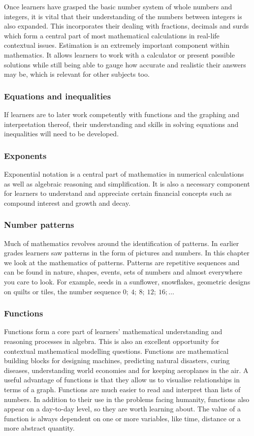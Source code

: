 Once learners have grasped the basic number system of whole numbers and integers, it is vital that their understanding of the numbers between integers is also expanded. This incorporates their dealing with fractions, decimals and surds which form a central part of most mathematical calculations in real-life contextual issues. Estimation is an extremely important component within mathematics. It allows learners to work with a calculator or present possible solutions while still being able to gauge how accurate and realistic their answers may be, which is relevant for other subjects too. 

\subsubsection{Equations and inequalities}
If learners are to later work competently with functions and the graphing and interpretation thereof, their understanding and skills in solving equations and inequalities will need to be developed. 
\subsubsection{Exponents}
Exponential notation is a central part of mathematics in numerical calculations as well as algebraic reasoning and simplification. It is also a necessary component for learners to understand and appreciate certain financial concepts such as compound interest and growth and decay. 
\subsubsection{Number patterns}
Much of mathematics revolves around the identification of patterns. In earlier grades learners saw patterns in the form of pictures and numbers. In this chapter  we look at the mathematics of patterns. Patterns are repetitive sequences and can be found in nature, shapes, events, sets of numbers and almost everywhere you care to look. For example, seeds in a sunflower, snowflakes, geometric designs on quilts or tiles, the number sequence $0; ~4;~ 8;~ 12; ~16; \ldots$
\subsubsection{Functions}
Functions form a core part of learners’ mathematical understanding and reasoning processes in algebra. This is also an excellent opportunity for contextual mathematical modelling questions. Functions are mathematical building blocks for designing machines, predicting natural disasters, curing diseases, understanding world economies and for keeping aeroplanes in the air. A useful advantage of functions is that they allow us to visualise relationships in terms of a graph. Functions are much easier to read and interpret than lists of numbers. In addition to their use in the problems facing humanity, functions also appear on a day-to-day level, so they are worth learning about. The value of a function is always dependent on one or more variables, like time, distance or a more abstract  quantity.

